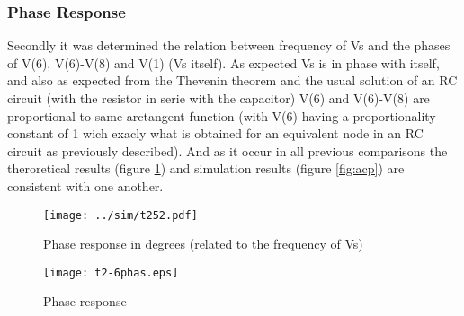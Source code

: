 
\subsubsection{Phase Response}

Secondly it was determined the relation between frequency of Vs and the phases of V(6), V(6)-V(8) and V(1) (Vs itself). As expected Vs is in phase with itself, and also as expected from the Thevenin theorem  and the usual solution of an RC circuit (with the resistor in serie with the capacitor) V(6) and V(6)-V(8) are proportional to same arctangent function (with V(6) having a proportionality constant of 1 wich exacly what is obtained for an equivalent node in an RC circuit as previously described). And as it occur in all previous comparisons the theroretical results (figure \ref{fig:comphas}) and simulation results (figure \ref{fig:acp}) are consistent with one another.

\begin{figure}[h] \centering
  \begin{minipage}{.5\textwidth}
    \texttt{[image: ../sim/t252.pdf]}
    \caption{Phase response in degrees (related to the frequency of Vs)}
    \label{fig:acp}
    \end{minipage}%
  \begin{minipage}{.5\textwidth}
    \vspace{10mm}
  \centering
    \texttt{[image: t2-6phas.eps]}
    \caption{Phase response}
    \label{fig:comphas}
      \end{minipage}%
\end{figure}








